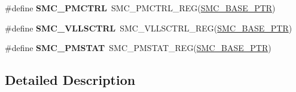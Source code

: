 \begin{DoxyCompactItemize}
\item 
\hypertarget{group___s_m_c___register___accessor___macros_ga4b2bae0309aecee21e9fe70ac7dbe3dc}{}\#define {\bfseries S\+M\+C\+\_\+\+P\+M\+C\+T\+R\+L}~S\+M\+C\+\_\+\+P\+M\+C\+T\+R\+L\+\_\+\+R\+E\+G(\hyperlink{group___s_m_c___peripheral_ga31b6c4571795341e6446800243313e56}{S\+M\+C\+\_\+\+B\+A\+S\+E\+\_\+\+P\+T\+R})\label{group___s_m_c___register___accessor___macros_ga4b2bae0309aecee21e9fe70ac7dbe3dc}

\item 
\hypertarget{group___s_m_c___register___accessor___macros_gabc1de81f94174f2aaebdc6a51b782fee}{}\#define {\bfseries S\+M\+C\+\_\+\+V\+L\+L\+S\+C\+T\+R\+L}~S\+M\+C\+\_\+\+V\+L\+L\+S\+C\+T\+R\+L\+\_\+\+R\+E\+G(\hyperlink{group___s_m_c___peripheral_ga31b6c4571795341e6446800243313e56}{S\+M\+C\+\_\+\+B\+A\+S\+E\+\_\+\+P\+T\+R})\label{group___s_m_c___register___accessor___macros_gabc1de81f94174f2aaebdc6a51b782fee}

\item 
\hypertarget{group___s_m_c___register___accessor___macros_ga6311e0572e3a1f7d84e1069716b64307}{}\#define {\bfseries S\+M\+C\+\_\+\+P\+M\+S\+T\+A\+T}~S\+M\+C\+\_\+\+P\+M\+S\+T\+A\+T\+\_\+\+R\+E\+G(\hyperlink{group___s_m_c___peripheral_ga31b6c4571795341e6446800243313e56}{S\+M\+C\+\_\+\+B\+A\+S\+E\+\_\+\+P\+T\+R})\label{group___s_m_c___register___accessor___macros_ga6311e0572e3a1f7d84e1069716b64307}

\end{DoxyCompactItemize}


\subsection{Detailed Description}
